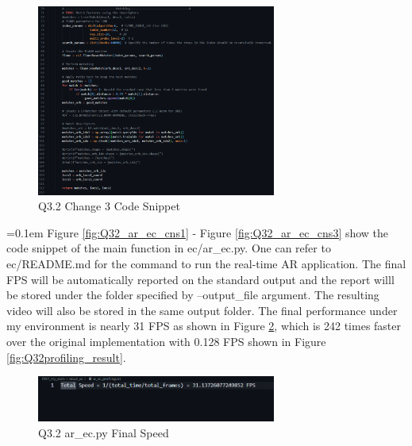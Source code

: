 \documentclass{article}
\begin{document}
	\begin{figure}[H]
	\centering
	\includegraphics[width=0.7\textwidth]{./Q3_2_ar_ec_change3_cns1.png}  %
	\caption{Q3.2 Change 3 Code Snippet}
	\label{fig:Q32_change3_cns1}
	\end{figure}
	
	\hangindent=0.1em \hspace{0.1em}Figure \ref{fig:Q32_ar_ec_cns1} - Figure \ref{fig:Q32_ar_ec_cns3} show the code snippet of the main function in ec/ar\_ec.py. One can refer to ec/README.md for the command to run the real-time AR application. The final FPS will be automatically reported on the standard output and the report willl be stored under the folder specified by --output\_file argument. The resulting video will also be stored in the same output folder. The final performance under my environment is nearly 31 FPS as shown in Figure \ref{fig:Q32_ar_ec_fs}, which is 242 times faster over the original implementation with 0.128 FPS shown in Figure \ref{fig:Q32profiling_result}.
	
	\begin{figure}[H]
		\centering
		\includegraphics[width=0.7\textwidth]{./Q3_2_ar_ec_final_speed.png}  %
		\caption{Q3.2 ar\_ec.py Final Speed}
		\label{fig:Q32_ar_ec_fs}
	\end{figure}	
	
\end{document}
